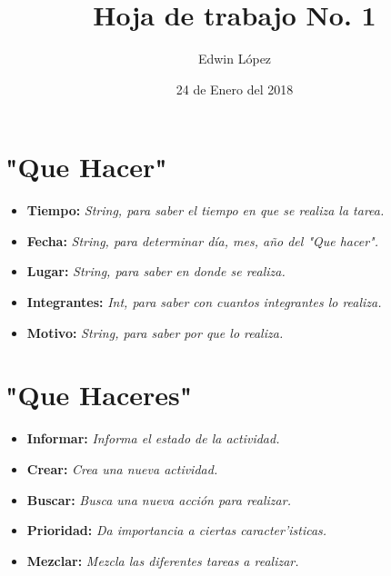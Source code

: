 \documentclass{article}
\author{Edwin L\'opez}
\title {\textbf{Hoja de trabajo No. 1}}
\date {24 de Enero del 2018}
\begin{document}
\maketitle


\section{"Que Hacer"}

\begin{itemize}

\item \textbf{Tiempo:} \textit{String, para saber el tiempo en que se realiza la tarea.}
\item \textbf{Fecha:} \textit{ String, para determinar d\'ia, mes, a\~no del "Que hacer".}
\item \textbf{Lugar:} \textit{String, para saber en donde se realiza.}
\item \textbf{Integrantes:} \textit{Int, para saber con cuantos integrantes lo realiza.}
\item \textbf{Motivo:} \textit{String, para saber por que lo realiza.}

\end{itemize}

\section{"Que Haceres"}
\begin{itemize}

\item \textbf{Informar:} \textit{Informa el estado de la actividad.}
\item \textbf{Crear:} \textit{Crea una nueva actividad.}
\item \textbf{Buscar:} \textit{ Busca una nueva acci\'on para realizar.}
\item \textbf{Prioridad:} \textit{Da importancia a ciertas caracter'isticas.}
\item \textbf{Mezclar:} \textit{Mezcla las diferentes tareas a realizar.}

\end{itemize}
\end{document}
